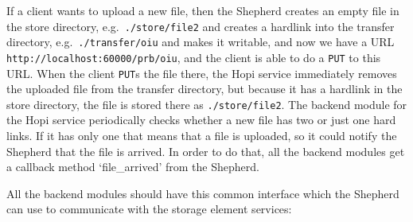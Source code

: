 \documentclass{book}
\begin{document}
If a client wants to upload a new file, then the Shepherd creates an empty file in the store directory, e.g.~\verb!./store/file2! and creates a hardlink into the transfer directory, e.g.~\verb!./transfer/oiu! and makes it writable, and now we have a URL \verb!http://localhost:60000/prb/oiu!, and the client is able to do a \verb!PUT! to this URL. When the client \verb!PUT!s the file there, the Hopi service immediately removes the uploaded file from the transfer directory, but because it has a hardlink in the store directory, the file is stored there as \verb!./store/file2!. The backend module for the Hopi service periodically checks whether a new file has two or just one hard links. If it has only one that means that a file is uploaded, so it could notify the Shepherd that the file is arrived. In order to do that, all the backend modules get a callback method `file\_arrived' from the Shepherd.

All the backend modules should have this common interface which the Shepherd can use to communicate with the storage element services:
\end{document}
